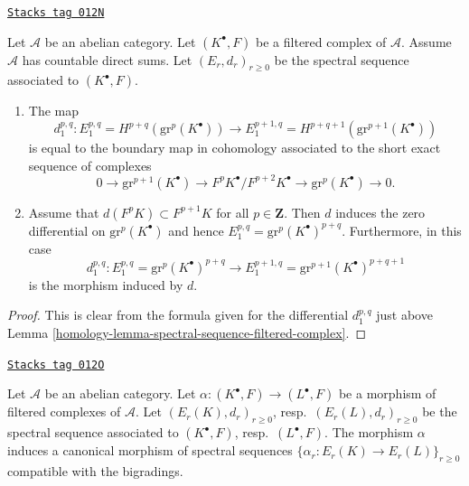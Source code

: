 \begin{lemma}
\label{homology-lemma-spectral-sequence-filtered-complex-d1}
\href{https://stacks.math.columbia.edu/tag/012N}{\texttt{Stacks tag 012N}}

Let $\mathcal{A}$ be an abelian category.
Let $(K^\bullet, F)$ be a filtered complex of $\mathcal{A}$.
Assume $\mathcal{A}$ has countable direct sums.
Let $(E_r, d_r)_{r \geq 0}$ be the spectral sequence
associated to $(K^\bullet, F)$.
\begin{enumerate}
\item The map
$$
d_1^{p, q} :
E_1^{p, q} = H^{p + q}(\text{gr}^p(K^\bullet))
\longrightarrow
E_1^{p + 1, q} = H^{p + q + 1}(\text{gr}^{p + 1}(K^\bullet))
$$
is equal to the boundary map in cohomology associated to the short
exact sequence of complexes
$$
0 \to \text{gr}^{p + 1}(K^\bullet) \to
F^pK^\bullet/F^{p + 2}K^\bullet \to \text{gr}^p(K^\bullet) \to 0.
$$
\item Assume that $d(F^pK) \subset F^{p + 1}K$ for all $p \in \mathbf{Z}$.
Then $d$ induces the zero differential on $\text{gr}^p(K^\bullet)$
and hence
$E_1^{p, q} = \text{gr}^p(K^\bullet)^{p + q}$.
Furthermore, in this case
$$
d_1^{p, q} :
E_1^{p, q} = \text{gr}^p(K^\bullet)^{p + q}
\longrightarrow
E_1^{p + 1, q} = \text{gr}^{p + 1}(K^\bullet)^{p + q + 1}
$$
is the morphism induced by $d$.
\end{enumerate}
\end{lemma}

\begin{proof}

This is clear from the formula given for the differential
$d_1^{p, q}$ just above Lemma \ref{homology-lemma-spectral-sequence-filtered-complex}.
\end{proof}

\begin{lemma}
\label{homology-lemma-spectral-sequence-filtered-complex-functorial}
\href{https://stacks.math.columbia.edu/tag/012O}{\texttt{Stacks tag 012O}}

Let $\mathcal{A}$ be an abelian category.
Let $\alpha : (K^\bullet, F) \to (L^\bullet, F)$ be a morphism of
filtered complexes of $\mathcal{A}$. Let $(E_r(K), d_r)_{r \geq 0}$,
resp.\ $(E_r(L), d_r)_{r \geq 0}$ be the spectral sequence associated
to $(K^\bullet, F)$, resp.\ $(L^\bullet, F)$.
The morphism $\alpha$ induces a canonical morphism of spectral
sequences $\{\alpha_r : E_r(K) \to E_r(L)\}_{r \geq 0}$ compatible
with the bigradings.
\end{lemma}

